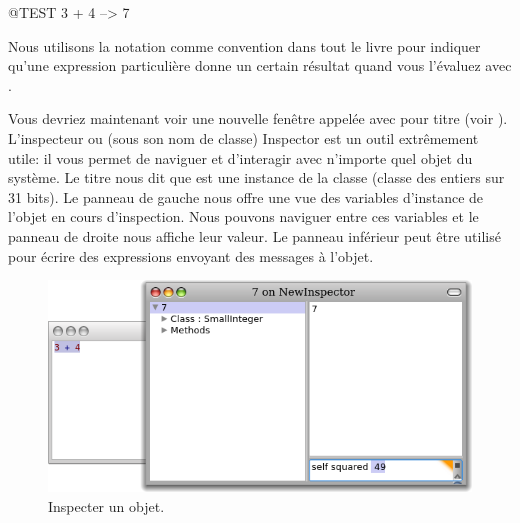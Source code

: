\documentclass[a4paper,10pt,twoside]{book}
\begin{document}
\begin{code}{@TEST}
3 + 4 --> 7
\end{code}
\noindent
Nous utilisons la notation \ct{-->}{} comme convention dans tout le
livre pour indiquer qu'une expression particulière donne un certain
résultat quand vous l'évaluez avec .


\noindent
Vous devriez maintenant voir une nouvelle fenêtre appelée
 avec pour titre 
  (voir ).
L'inspecteur ou (sous son nom de classe) Inspector est un outil
extrêmement utile: il vous permet de naviguer et d'interagir avec
n'importe quel objet du système.
Le titre nous dit que  est une instance de la classe
(classe des entiers sur 31 bits).
Le panneau de gauche nous offre une vue des variables d'instance de
l'objet en cours d'inspection. Nous pouvons naviguer entre ces
variables et le panneau de droite nous affiche leur valeur.
Le panneau inférieur peut être utilisé pour écrire des
expressions envoyant des messages à l'objet.

\begin{figure}[htb]
\centerline {\includegraphics[width=\textwidth]{InspectIt}}
\caption{Inspecter un objet.}
\end{figure}

\end{document}
